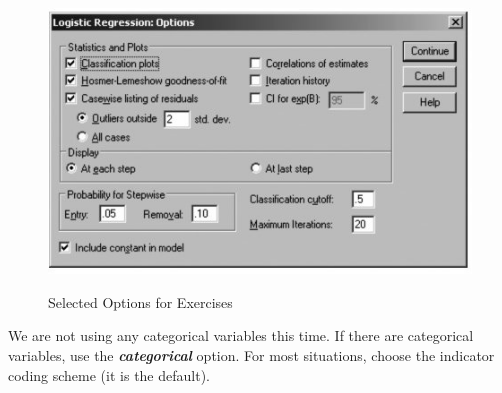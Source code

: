 ﻿\documentclass[a4paper,12pt]{article}
\begin{document}
\begin{figure}[h!]
\begin{center}
  \includegraphics[scale=0.8]{images/Logistic10}\\
  \caption{Selected Options for Exercises}
\end{center}
\end{figure}

We are not using any categorical variables this time. If there are categorical variables, use the \textbf{\textit{categorical}} option. For most situations, choose the indicator coding scheme (it is the
default).
\end{document}
